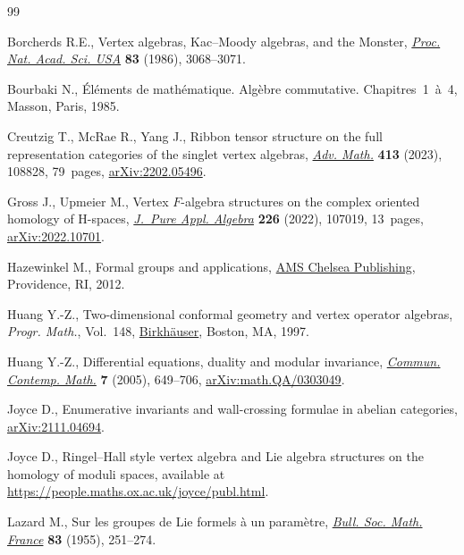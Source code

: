 \begin{thebibliography}{99}
\footnotesize\itemsep=0pt

Borcherds R.E., Vertex algebras, {K}ac--{M}oody algebras, and the {M}onster,
 \href{https://doi.org/10.1073/pnas.83.10.3068}{\textit{Proc. Nat. Acad. Sci.
 USA}} \textbf{83} (1986), 3068--3071.

Bourbaki N., {\'{E}}l\'ements de math\'ematique. Alg\`ebre commutative.
 {C}hapitres~1~\`a~4, Masson, Paris, 1985.

Creutzig T., McRae R., Yang J., Ribbon tensor structure on the full
 representation categories of the singlet vertex algebras,
 \href{https://doi.org/10.1016/j.aim.2022.108828}{\textit{Adv. Math.}}
 \textbf{413} (2023), 108828, 79~pages,
 \href{http://arxiv.org/abs/2202.05496}{arXiv:2202.05496}.

Gross J., Upmeier M., Vertex {$F$}-algebra structures on the complex oriented
 homology of {H}-spaces,
 \href{https://doi.org/10.1016/j.jpaa.2022.107019}{\textit{J.~Pure Appl.
 Algebra}} \textbf{226} (2022), 107019, 13~pages,
 \href{http://arxiv.org/abs/2022.10701}{arXiv:2022.10701}.

Hazewinkel M., Formal groups and applications,
 \href{https://doi.org/10.1090/chel/375}{AMS Chelsea Publishing}, Providence,
 RI, 2012.

Huang Y.-Z., Two-dimensional conformal geometry and vertex operator algebras,
 \textit{Progr. Math.}, Vol.~148,
 \href{https://doi.org/10.1007/978-1-4612-4276-5}{Birkh\"auser}, Boston, MA,
 1997.

Huang Y.-Z., Differential equations, duality and modular invariance,
 \href{https://doi.org/10.1142/S021919970500191X}{\textit{Commun. Contemp.
 Math.}} \textbf{7} (2005), 649--706,
 \href{http://arxiv.org/abs/math.QA/0303049}{arXiv:math.QA/0303049}.

Joyce D., Enumerative invariants and wall-crossing formulae in abelian
 categories, \href{http://arxiv.org/abs/2111.04694}{arXiv:2111.04694}.

Joyce D., Ringel--{H}all style vertex algebra and {L}ie algebra structures on
 the homology of moduli spaces, available at
 \url{https://people.maths.ox.ac.uk/joyce/publ.html}.

Lazard M., Sur les groupes de {L}ie formels \`a un param\`etre,
 \href{https://doi.org/10.24033/bsmf.1462}{\textit{Bull. Soc. Math. France}}
 \textbf{83} (1955), 251--274.


\end{thebibliography}
